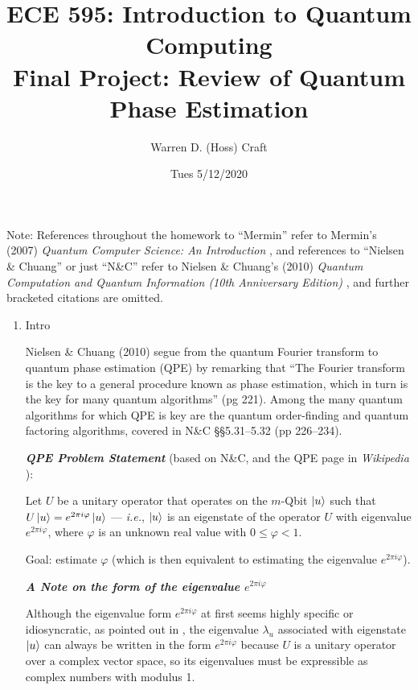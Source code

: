 \documentclass{article}
\title{ECE 595: Introduction to Quantum Computing\\
Final Project: Review of Quantum Phase Estimation}
\author{Warren D. (Hoss) Craft}
\date{Tues 5/12/2020}
\begin{document}
\maketitle

\flushleft

Note: References throughout the homework to ``Mermin'' refer to Mermin's (2007) \textit{Quantum Computer Science: An Introduction} \cite{Mermin_2007}, and references to ``Nielsen \& Chuang'' or just ``N\&C'' refer to Nielsen \& Chuang's (2010) \textit{Quantum Computation and Quantum Information (10th Anniversary Edition)} \cite{Nielsen_&_Chuang_2010}, and further bracketed citations are omitted.

\begin{enumerate}[label=\textbf{(\arabic*)}]

\item Intro

Nielsen \& Chuang (2010) segue from the quantum Fourier transform to quantum phase estimation (QPE) by remarking that ``The Fourier transform is the key to a general procedure known as phase estimation, which in turn is the key for many quantum algorithms'' (pg 221). Among the many quantum algorithms for which QPE is key are the quantum order-finding and quantum factoring algorithms, covered in N\&C \S\S 5.31--5.32 (pp 226--234).

\textbf{\textit{QPE Problem Statement}} (based on N\&C, and the QPE page in \textit{Wikipedia} \cite{wikipedia:qpe}):

\begin{adjustwidth}{0.5in}{0.5in}
Let $U$ be a unitary operator that operates on the $m$-Qbit $\ket{u}$ such that $U\ket{u} = e^{2\pi i \varphi}\ket{u}$ --- \textit{i.e.}, $\ket{u}$ is an eigenstate of the operator $U$ with eigenvalue $e^{2\pi i \varphi}$, where $\varphi$ is an unknown real value with $0\le\varphi<1$.

Goal: estimate $\varphi$ (which is then equivalent to estimating the eigenvalue $e^{2\pi i \varphi}$).
\end{adjustwidth}

\textbf{\textit{A Note on the form of the eigenvalue $e^{2\pi i \varphi}$}}

Although the eigenvalue form $e^{2\pi i \varphi}$ at first seems highly specific or idiosyncratic, as pointed out in \cite{wikipedia:qpe}, the eigenvalue $\lambda_u$ associated with eigenstate $\ket{u}$ can always be written in the form $e^{2\pi i \varphi}$ because $U$ is a unitary operator over a complex vector space, so its eigenvalues must be expressible as complex numbers with modulus 1.


\end{enumerate}
\end{document}
